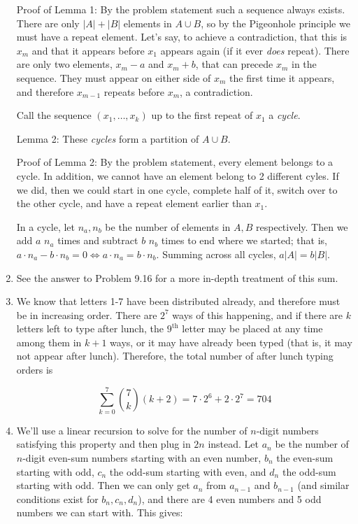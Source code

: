 \documentclass{book}
\numberwithin{equation}{section}
\begin{document}
\begin{enumerate}[label={9.\arabic*}]
Proof of Lemma 1: By the problem statement such a sequence always exists. There are only $|A| + |B|$ elements in $A \cup B$,
so by the Pigeonhole principle we must have a repeat element. Let's say, to achieve a contradiction, that this is $x_m$
and that it appears before $x_1$ appears again (if it ever \emph{does} repeat). There are only two elements, $x_m - a$ and
$x_m + b$, that can precede $x_m$ in the sequence. They must appear on either side of $x_m$ the first time it appears,
and therefore $x_{m-1}$ repeats before $x_m$, a contradiction.

Call the sequence $(x_1, \ldots, x_k)$ up to the first repeat of $x_1$ a \emph{cycle}.

Lemma 2: These \emph{cycles} form a partition of $A \cup B$.

Proof of Lemma 2: By the problem statement, every element belongs to a cycle. In addition, we cannot have an
element belong to 2 different cyles. If we did, then we could start in one cycle, complete half of it, switch over to the
other cycle, and have a repeat element earlier than $x_1$.

In a cycle, let $n_a, n_b$ be the number of elements in $A, B$ respectively. Then we add $a$ $n_a$ times and subtract
$b$ $n_b$ times to end where we started; that is, $a\cdot n_a - b\cdot n_b = 0 \iff a\cdot n_a = b \cdot n_b$. Summing
across all cycles, $a|A| = b|B|$.

\item
See the answer to Problem 9.16 for a more in-depth treatment of this sum.

\item
We know that letters 1-7 have been distributed already, and therefore must be in increasing order. There are $2^7$
ways of this happening, and if there are $k$ letters left to type after lunch, the $9^{\text{th}}$ letter may be placed
at any time among them in $k+1$ ways, or it may have already been typed (that is, it may not appear after lunch).
Therefore, the total number of after lunch typing orders is

$$\sum_{k=0}^7 {7 \choose k}(k+2) = 7\cdot2^6 + 2\cdot2^7 = 704$$

\item
We'll use a linear recursion to solve for the number of $n$-digit numbers satisfying this property and then plug in $2n$
instead. Let $a_n$ be the number of $n$-digit even-sum numbers starting with an even number, $b_n$ the even-sum
starting with odd, $c_n$ the odd-sum starting with even, and $d_n$ the odd-sum starting with odd. Then we can only
get $a_n$ from $a_{n-1}$ and $b_{n-1}$ (and similar conditions exist for $b_n, c_n, d_n$), and there are 4 even
numbers and 5 odd numbers we can start with. This gives:


\end{enumerate}
\end{document}
